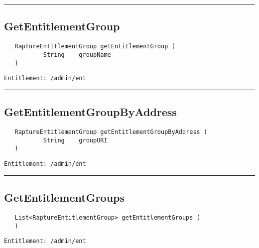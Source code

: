 \rule{12cm}{2pt}
\subsection{GetEntitlementGroup}
\label{Api:GetEntitlementGroup}
\begin{verbatim}
   RaptureEntitlementGroup getEntitlementGroup (
           String    groupName
   )
\end{verbatim}
\begin{Verbatim}[fontsize=\small, formatcom=\color{Maroon}]
  Entitlement: /admin/ent
\end{Verbatim}



\rule{12cm}{2pt}
\subsection{GetEntitlementGroupByAddress}
\label{Api:GetEntitlementGroupByAddress}
\begin{verbatim}
   RaptureEntitlementGroup getEntitlementGroupByAddress (
           String    groupURI
   )
\end{verbatim}
\begin{Verbatim}[fontsize=\small, formatcom=\color{Maroon}]
  Entitlement: /admin/ent
\end{Verbatim}



\rule{12cm}{2pt}
\subsection{GetEntitlementGroups}
\label{Api:GetEntitlementGroups}
\begin{verbatim}
   List<RaptureEntitlementGroup> getEntitlementGroups (
   )
\end{verbatim}
\begin{Verbatim}[fontsize=\small, formatcom=\color{Maroon}]
  Entitlement: /admin/ent
\end{Verbatim}



